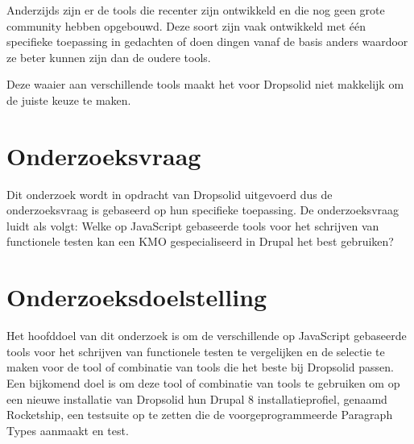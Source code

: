 Anderzijds zijn er de \glspl{tool} die recenter zijn ontwikkeld en die nog geen grote community hebben opgebouwd. Deze soort zijn  vaak ontwikkeld met één specifieke toepassing in gedachten of doen dingen vanaf de basis anders waardoor ze beter kunnen zijn dan de oudere \glspl{tool}. 

Deze waaier aan verschillende \glspl{tool} maakt het voor Dropsolid niet makkelijk om de juiste keuze te maken.



\clearpage
\section{Onderzoeksvraag}
\label{sec:onderzoeksvraag}
Dit onderzoek wordt in opdracht van Dropsolid uitgevoerd dus de onderzoeksvraag is gebaseerd op hun specifieke toepassing. De onderzoeksvraag luidt als volgt: Welke op JavaScript gebaseerde \glspl{tool} voor het schrijven van functionele testen kan een \gls{KMO} gespecialiseerd in Drupal het best gebruiken?


\section{Onderzoeksdoelstelling}
\label{sec:onderzoeksdoelstelling}
Het hoofddoel van dit onderzoek is om de verschillende op JavaScript gebaseerde \glspl{tool} voor het schrijven van functionele testen te vergelijken en de selectie te maken voor de \gls{tool} of combinatie van \glspl{tool} die het beste bij Dropsolid passen. Een bijkomend doel is om deze \gls{tool} of combinatie van \glspl{tool} te gebruiken om op een nieuwe installatie van Dropsolid hun Drupal 8 installatieprofiel, genaamd Rocketship, een \gls{testsuite} op te zetten die de voorgeprogrammeerde \gls{Paragraph Types} aanmaakt en test.


